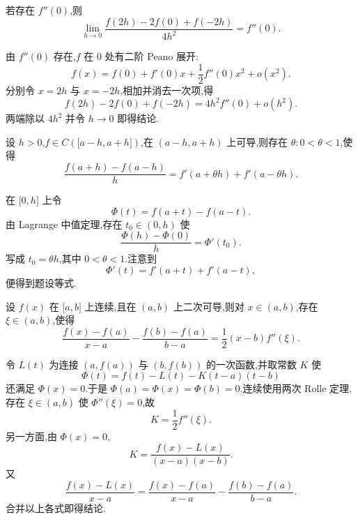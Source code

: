 \begin{example}
    若存在 $f''(0)$,则
    \[
        \displaystyle\lim\limits_{h\to0}
        \dfrac{f(2h)-2f(0)+f(-2h)}{4h^2}
        =f''(0).
    \]
\end{example}
\exampleblank

\begin{solution}
    由 $f''(0)$ 存在,$f$ 在 $0$ 处有二阶 Peano 展开:
    \[
        f(x)=f(0)+f'(0)x+\dfrac{1}{2}f''(0)x^2+o(x^2).
    \]
    分别令 $x=2h$ 与 $x=-2h$,相加并消去一次项,得
    \[
        f(2h)-2f(0)+f(-2h)=4h^2f''(0)+o(h^2).
    \]
    两端除以 $4h^2$ 并令 $h\to0$ 即得结论.
\end{solution}

\begin{example}
    设 $h>0$,$f\in C(\lbrack a-h,a+h\rbrack)$,在 $(a-h,a+h)$ 上可导,则存在 $\theta:0<\theta<1$,使得
    \[
        \dfrac{f(a+h)-f(a-h)}{h}
        =f'(a+\theta h)+f'(a-\theta h).
    \]
\end{example}
\exampleblank

\begin{solution}
    在 $\lbrack0,h\rbrack$ 上令
    \[
        \Phi(t)=f(a+t)-f(a-t).
    \]
    由 Lagrange 中值定理,存在 $t_0\in(0,h)$ 使
    \[
        \dfrac{\Phi(h)-\Phi(0)}{h}=\Phi'(t_0).
    \]
    写成 $t_0=\theta h$,其中 $0<\theta<1$.注意到
    \[
        \Phi'(t)=f'(a+t)+f'(a-t),
    \]
    便得到题设等式.
\end{solution}

\begin{example}
    设 $f(x)$ 在 $\lbrack a,b\rbrack$ 上连续,且在 $(a,b)$ 上二次可导,则对 $x\in(a,b)$,存在 $\xi\in(a,b)$,使得
    \[
        \dfrac{f(x)-f(a)}{x-a}
        -\dfrac{f(b)-f(a)}{b-a}
        =\dfrac{1}{2}(x-b)f''(\xi).
    \]
\end{example}
\exampleblank

\begin{solution}
    令 $L(t)$ 为连接 $(a,f(a))$ 与 $(b,f(b))$ 的一次函数,并取常数 $K$ 使
    \[
        \Phi(t)=f(t)-L(t)-K(t-a)(t-b)
    \]
    还满足 $\Phi(x)=0$.于是 $\Phi(a)=\Phi(x)=\Phi(b)=0$.连续使用两次 Rolle 定理,存在 $\xi\in(a,b)$ 使 $\Phi''(\xi)=0$,故
    \[
        K=\dfrac{1}{2}f''(\xi).
    \]
    另一方面,由 $\Phi(x)=0$,
    \[
        K=\dfrac{f(x)-L(x)}{(x-a)(x-b)}.
    \]
    又
    \[
        \dfrac{f(x)-L(x)}{x-a}
        =\dfrac{f(x)-f(a)}{x-a}
        -\dfrac{f(b)-f(a)}{b-a}.
    \]
    合并以上各式即得结论.
\end{solution}

